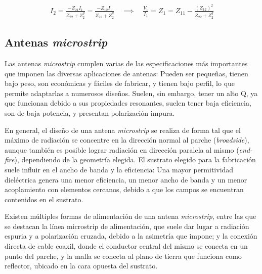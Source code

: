 \begin{align}
	\label{eq:impedanciaAntenaEnArray}
	I_2 = \frac{-Z_{21}I_1}{Z_{22}+Z^g_{2}} = \frac{-Z_{12}I_1}{Z_{22}+Z^g_{2}}  \quad \implies \quad
	\frac{V_1}{I_1} = Z_1 = Z_{11} - \frac{(Z_{12})^2}{Z_{22}+Z^g_2}
\end{align}


\subsection{Antenas \textit{microstrip}}
\label{subsec_antenas_microstrip}
Las antenas \textit{microstrip} cumplen varias de las especificaciones más importantes que imponen las diversas aplicaciones de antenas: Pueden ser pequeñas, tienen bajo peso, son económicas y fáciles de fabricar, y tienen bajo perfil, lo que permite adaptarlas a numerosos diseños. Suelen, sin embargo, tener un alto Q, ya que funcionan debido a sus propiedades resonantes, suelen tener baja eficiencia, son de baja potencia, y presentan polarización impura.

En general, el diseño de una antena \textit{microstrip} se realiza de forma tal que el máximo de radiación se concentre en la dirección normal al parche (\textit{broadside}), aunque también es posible lograr radiación en dirección paralela al mismo (\textit{end-fire}), dependiendo de la geometría elegida. El sustrato elegido para la fabricación suele influir en el ancho de banda y la eficiencia: Una mayor permitividad dieléctrica genera una menor eficiencia, un menor ancho de banda y un menor acoplamiento con elementos cercanos, debido a que los campos se encuentran contenidos en el sustrato.

Existen múltiples formas de alimentación de una antena \textit{microstrip}, entre las que se destacan la línea microstrip de alimentación, que suele dar lugar a radiación espuria y a polarización cruzada, debido a la asimetría que impone; y la conexión directa de cable coaxil, donde el conductor central del mismo se conecta en un punto del parche, y la malla se conecta al plano de tierra que funciona como reflector, ubicado en la cara opuesta del sustrato.

